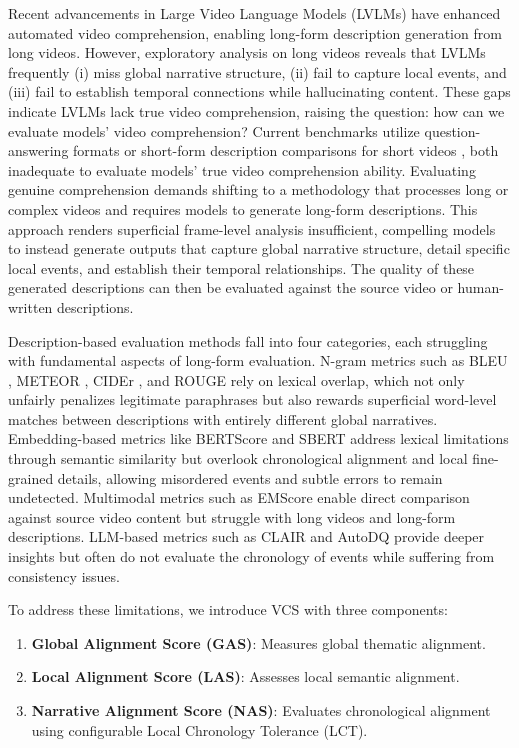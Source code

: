\documentclass[letterpaper]{article} %
\begin{document}
Recent advancements in Large Video Language Models (LVLMs) \citep{Yuan2025Tarsier2,Shen2025LongVU,Ataallah2024Goldfish,Chen2025LongVILA} have enhanced automated video comprehension, enabling long-form description generation from long videos. However, exploratory analysis on long videos reveals that LVLMs frequently (i) miss global narrative structure, (ii) fail to capture local events, and (iii) fail to establish temporal connections while hallucinating content. These gaps indicate LVLMs lack true video comprehension, raising the question: how can we evaluate models' video comprehension? Current benchmarks utilize question-answering formats \citep{wu2024longvideobench,ataallah2024infinibench,nagrani2025neptune} or short-form description comparisons for short videos \citep{wyzs:24,chen:acl11,ZhXuCoAAAI18}, both inadequate to evaluate models' true video comprehension ability. Evaluating genuine comprehension demands shifting to a methodology that processes long or complex videos and requires models to generate long-form descriptions. This approach renders superficial frame-level analysis insufficient, compelling models to instead generate outputs that capture global narrative structure, detail specific local events, and establish their temporal relationships. The quality of these generated descriptions can then be evaluated against the source video or human-written descriptions.

Description-based evaluation methods fall into four categories, each struggling with fundamental aspects of long-form evaluation. N-gram metrics such as BLEU \citep{p:02}, METEOR \citep{bl:05}, CIDEr \citep{v:15}, and ROUGE \citep{l:04} rely on lexical overlap, which not only unfairly penalizes legitimate paraphrases but also rewards superficial word-level matches between descriptions with entirely different global narratives. Embedding-based metrics like BERTScore \citep{z:20} and SBERT \citep{r:19} address lexical limitations through semantic similarity but overlook chronological alignment and local fine-grained details, allowing misordered events and subtle errors to remain undetected. Multimodal metrics such as EMScore \citep{syxl:22} enable direct comparison against source video content but struggle with long videos and long-form descriptions. LLM-based metrics such as CLAIR \citep{chan:23} and AutoDQ \citep{wyzs:24} provide deeper insights but often do not evaluate the chronology of events while suffering from consistency issues.

To address these limitations, we introduce VCS with three components:
\begin{enumerate}
\item \textbf{Global Alignment Score (GAS)}: Measures global thematic alignment.
\item \textbf{Local Alignment Score (LAS)}: Assesses local semantic alignment.
\item \textbf{Narrative Alignment Score (NAS)}: Evaluates chronological alignment using configurable Local Chronology Tolerance (LCT).
\end{enumerate}
\end{document}
